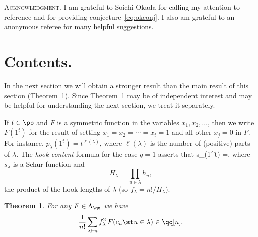 \documentclass[12pt]{article}
\newtheorem{theorem}{Theorem}[section]
\theoremstyle{definition}
\theoremstyle{remark}
\begin{document}
\medskip 
\textsc{Acknowledgment.} I am grateful to Soichi Okada for calling my
attention to reference \cite{fkmo} and for providing
conjecture~\eqref{eq:okconj}. I also am grateful to an anonymous
referee for many helpful suggestions.

\section{Contents.} \label{sec2} 
In the next section we will obtain a stronger result than the main
result of this section (Theorem~\ref{thm:cu}). Since
Theorem~\ref{thm:cu} may be of independent interest and may be helpful
for understanding the next section, we treat it separately.

If $t\in\pp$ and $F$ is a symmetric function in the variables
$x_1,x_2,\dots$, then we write $F(1^t)$ for the result of setting
$x_1=x_2=\cdots=x_t=1$ and all other $x_j=0$ in $F$. For instance,
$p_\lambda(1^t)= t^{\ell(\lambda)}$, where $\ell(\lambda)$ is the
number of (positive) parts of $\lambda$. The \emph{hook-content}
formula for the case $q=1$ \cite[Cor.~7.21.4]{ec2} asserts that
  \beq s_\lambda(1^t) =, 
    \label{eq:hoco} \eeq
where $s_\lambda$ is a Schur function and 
  $$ H_\lambda=\prod_{u\in\lambda} h_u, $$
the product of the hook lengths of $\lambda$ (so
$f_\lambda=n!/H_\lambda$). 

\begin{theorem} \label{thm:cu}
For any $F\in\Lambda_{\qq}$ we have 
  $$ \frac{1}{n!}\sum_{\lambda\vdash n} f_\lambda^2\,
            F(c_u\st u\in\lambda) \in \qq[n]. $$
\end{theorem}
\end{document}
